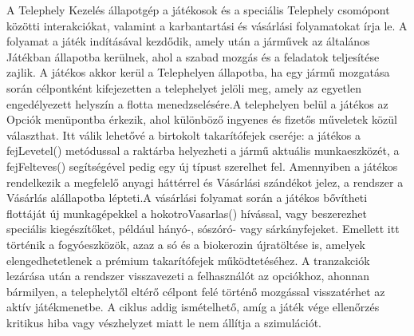 \par{A Telephely Kezelés állapotgép a játékosok és a speciális Telephely csomópont közötti interakciókat, valamint a karbantartási és vásárlási folyamatokat írja le. A folyamat a játék indításával kezdődik, amely után a járművek az általános Játékban állapotba kerülnek, ahol a szabad mozgás és a feladatok teljesítése zajlik. A játékos akkor kerül a Telephelyen állapotba, ha egy jármű mozgatása során célpontként kifejezetten a telephelyet jelöli meg, amely az egyetlen engedélyezett helyszín a flotta menedzselésére.A telephelyen belül a játékos az Opciók menüpontba érkezik, ahol különböző ingyenes és fizetős műveletek közül választhat. Itt válik lehetővé a birtokolt takarítófejek cseréje: a játékos a fejLevetel() metódussal a raktárba helyezheti a jármű aktuális munkaeszközét, a fejFelteves() segítségével pedig egy új típust szerelhet fel. Amennyiben a játékos rendelkezik a megfelelő anyagi háttérrel és Vásárlási szándékot jelez, a rendszer a Vásárlás alállapotba lépteti.A vásárlási folyamat során a játékos bővítheti flottáját új munkagépekkel a hokotroVasarlas() hívással, vagy beszerezhet speciális kiegészítőket, például hányó-, sószóró- vagy sárkányfejeket. Emellett itt történik a fogyóeszközök, azaz a só és a biokerozin újratöltése is, amelyek elengedhetetlenek a prémium takarítófejek működtetéséhez. A tranzakciók lezárása után a rendszer visszavezeti a felhasználót az opciókhoz, ahonnan bármilyen, a telephelytől eltérő célpont felé történő mozgással visszatérhet az aktív játékmenetbe. A ciklus addig ismételhető, amíg a játék vége ellenőrzés kritikus hiba vagy vészhelyzet miatt le nem állítja a szimulációt.}